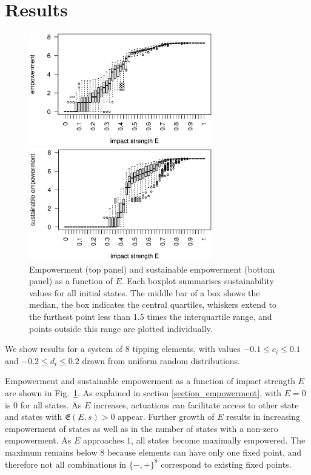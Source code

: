 \documentclass[conference]{IEEEtran}
\newcommand{\empowerment}{\ensuremath{\mathfrak{E}}}
\newcommand{\couplingconstant}{\ensuremath{d}}
\newcommand{\impactstrength}{\ensuremath{E}}
\begin{document}
\section{Results}

\begin{figure}
  \begin{center}

    \includegraphics[width=8cm]{n08_full_small_emp.eps}

    \includegraphics[width=8cm]{n08_full_small_empsust.eps}

  \end{center}

  \caption{Empowerment (top panel) and sustainable empowerment
    (bottom panel) as a function of $\impactstrength$. Each boxplot summarises
    sustainability values for all initial states. The middle bar of
    a box shows the median, the box indicates the central quartiles,
    whiskers extend to the furthest point less than 1.5 times the
    interquartile range, and points outside this range are plotted
    individually.}
  \label{fig_empowermentprofiles}
\end{figure}

We show results for a system of $8$ tipping elements, with values
$-0.1 \le c_i \le 0.1$ and $-0.2 \le \couplingconstant_i \le 0.2$
drawn from uniform random distributions.

Empowerment and sustainable empowerment as a function of impact
strength $\impactstrength$ are shown in Fig.~\ref{fig_empowermentprofiles}. As
explained in section \ref{section_empowerment}, with $\impactstrength =
0$ is $0$ for all states. As $\impactstrength$ increases, actuations can facilitate
access to other state and states with $\empowerment(E, s) > 0$ appear.
Further growth of $\impactstrength$ results in increasing empowerment of states as
well as in the number of states with a non-zero empowerment. As $\impactstrength$
approaches $1$, all states become maximally empowered. The maximum
remains below $8$ because elements can have only one fixed point, and
therefore not all combinations in $\{-, +\}^{8}$ correspond to
existing fixed points.
\end{document}
